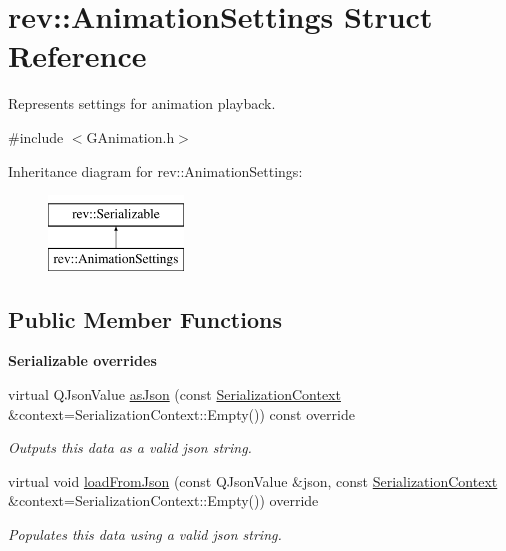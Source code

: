 \hypertarget{structrev_1_1_animation_settings}{}\section{rev\+::Animation\+Settings Struct Reference}
\label{structrev_1_1_animation_settings}


Represents settings for animation playback.  




{\ttfamily \#include $<$G\+Animation.\+h$>$}

Inheritance diagram for rev\+::Animation\+Settings\+:\begin{figure}[H]
\begin{center}
\leavevmode
\includegraphics[height=2.000000cm]{structrev_1_1_animation_settings}
\end{center}
\end{figure}
\subsection*{Public Member Functions}
\begin{Indent}\textbf{ Serializable overrides}\par
\begin{DoxyCompactItemize}
\item 
\mbox{\label{structrev_1_1_animation_settings_a48896b1b3d8a363841124b0bb2bbf238}} 
virtual Q\+Json\+Value \mbox{\hyperlink{structrev_1_1_animation_settings_a48896b1b3d8a363841124b0bb2bbf238}{as\+Json}} (const \mbox{\hyperlink{structrev_1_1_serialization_context}{Serialization\+Context}} \&context=Serialization\+Context\+::\+Empty()) const override
\begin{DoxyCompactList}\small\item\em Outputs this data as a valid json string. \end{DoxyCompactList}\item 
\mbox{\label{structrev_1_1_animation_settings_aa3ad45ee2f3fd528a3bde0f81ebb212b}} 
virtual void \mbox{\hyperlink{structrev_1_1_animation_settings_aa3ad45ee2f3fd528a3bde0f81ebb212b}{load\+From\+Json}} (const Q\+Json\+Value \&json, const \mbox{\hyperlink{structrev_1_1_serialization_context}{Serialization\+Context}} \&context=Serialization\+Context\+::\+Empty()) override
\begin{DoxyCompactList}\small\item\em Populates this data using a valid json string. \end{DoxyCompactList}\end{DoxyCompactItemize}
\end{Indent}
